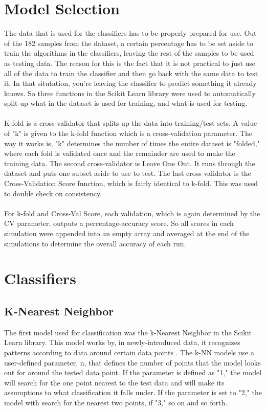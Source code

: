 \documentclass{report}
\begin{document}
\section{Model Selection}
The data that is used for the classifiers has to be properly prepared for use. Out of the 182 samples from the dataset, a certain percentage has to be set aside to train the 
algorithms in the classifiers, leaving the rest of the samples to be used as testing data. The reason for this is the fact that it is not practical to just use all of the 
data to train the classifier and then go back with the same data to test it. In that situtation, you're leaving the classifier to predict something it already knows. 
So three functions in the Scikit Learn library were used to automatically split-up what in the dataset is used for training, and what is used for testing. 
\\ \\K-fold is a cross-validator that splits up the data into training/test sets. A value of "k" is given to the k-fold function which is a cross-validation parameter. 
The way it works is, "k" determines the number of times the entire dataset is "folded," where each fold is validated once and the remainder are used to make the training data. 
The second cross-validator is Leave One Out. It runs through the dataset and puts one subset aside to use to test. The last cross-validator is the Cross-Validation Score function, 
which is fairly identical to k-fold. This was used to double check on consistency.
\\ \\For k-fold and Cross-Val Score, each validation, which is again determined by the CV parameter, outputs a percentage-accuracy score. So all scores in each simulation were 
appended into an empty array and averaged at the end of the simulations to determine the overall accuracy of each run.

\section{Classifiers}
\subsection{K-Nearest Neighbor}
The first model used for classification was the k-Nearest Neighbor in the Scikit Learn library. 
This model works by, in newly-introduced data, it recognizes patterns according to data around certain data points \cite{random}. The k-NN models use a user-defined 
parameter, n, that defines the number of points that the model looks out for around the tested data point. If the parameter is defined as "1," the model will search 
for the one point nearest to the test data and will make its assumptions to what classification it falls under. If the parameter is set to "2," the model with 
search for the nearest two points, if "3," so on and so forth.  
\end{document}
